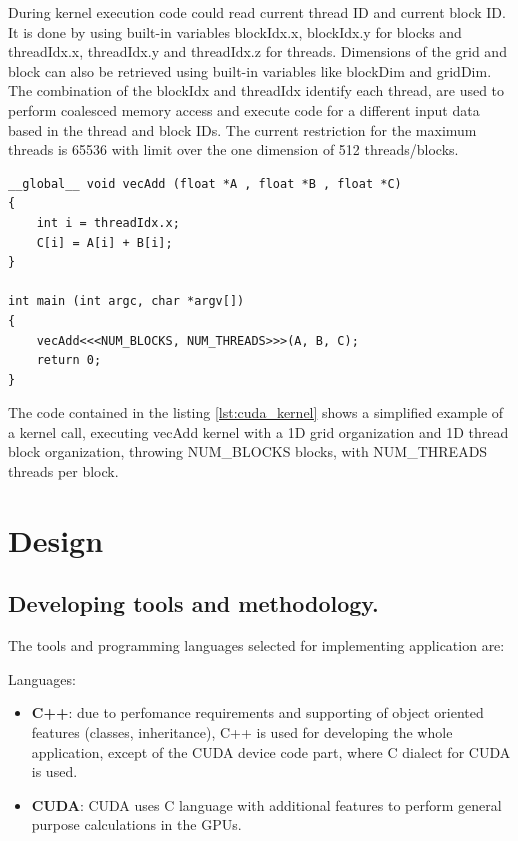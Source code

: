 \documentclass[thesis=M,english]{FITthesis}[2011/07/15]
\begin{document}
During kernel execution code could read current thread ID and current block ID. It is done by using built-in variables blockIdx.x, blockIdx.y for blocks and threadIdx.x, threadIdx.y and threadIdx.z for threads. Dimensions of the grid and block can also be retrieved using built-in variables like blockDim and gridDim. The combination of the blockIdx and threadIdx identify each thread, are used to perform coalesced memory access and execute code for a different input data based in the thread and block IDs. The current restriction for the maximum threads is 65536 with limit over the one dimension of 512 threads/blocks.

\begin{lstlisting}
__global__ void vecAdd (float *A , float *B , float *C)
{
	int i = threadIdx.x;
	C[i] = A[i] + B[i];
}

int main (int argc, char *argv[])
{
	vecAdd<<<NUM_BLOCKS, NUM_THREADS>>>(A, B, C);
	return 0;
}

\end{lstlisting}

The code contained in the listing \ref{lst:cuda_kernel} shows a simplified example of a kernel call, executing vecAdd kernel with a 1D grid organization and 1D thread block organization, throwing NUM\_BLOCKS blocks, with NUM\_THREADS threads per block.

\chapter{Design}
\label{chap:design}

\section{Developing tools and methodology.}
The tools and programming languages selected for implementing application are:

Languages:

\begin{itemize}
\item \textbf{C++}\cite{bjarn_str}: due to perfomance requirements and supporting of object oriented features (classes, inheritance), C++ is used for developing the whole application, except of the CUDA device code part, where C dialect for CUDA is used.
\item \textbf{CUDA}\cite{cuda_zone}: CUDA uses C language with additional features to perform general purpose calculations in the GPUs.
\end{itemize}
\end{document}
